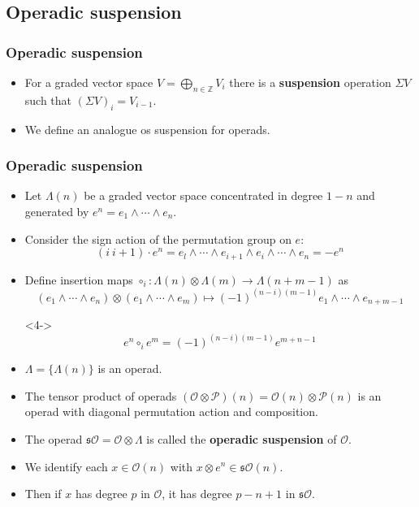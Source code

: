 \documentclass{beamer}
\theoremstyle{definition}
\newcommand{\Z}{\mathbb{Z}}
\begin{document}
\subsection{Operadic suspension}
\begin{frame}
\frametitle{Operadic suspension}
\begin{itemize}
\item<1-> For a graded vector space $V=\bigoplus_{n\in\Z} V_i$ there is a \textbf{suspension} operation $\Sigma V$ such that $(\Sigma V)_i=V_{i-1}$. %
\item<2-> We define an analogue os suspension for operads.
\end{itemize}
\end{frame}
\begin{frame}
\frametitle{Operadic suspension}
\begin{itemize}
\item<1-> Let $\Lambda(n)$ be a graded vector space concentrated in degree $1-n$ and generated by $e^n=e_1\land\cdots\land e_n$.
\item<2-> Consider the sign action of the permutation group on $e$:
\[(i\ i+1)\cdot e^n=e_l\land\cdots\land e_{i+1}\land e_i\land\cdots\land e_n=-e^n\]
\item<3-> Define insertion maps $\circ_i:\Lambda(n)\otimes\Lambda(m)\to\Lambda(n+m-1)$ as
\[(e_1\land\cdots\land e_n)\otimes(e_1\land\cdots\land e_m)\mapsto  (-1)^{(n-i)(m-1)}e_1\land\cdots\land e_{n+m-1}\]
\item[]<4-> \[e^n\circ_i e^m= (-1)^{(n-i)(m-1)}e^{m+n-1}\]
\end{itemize}
\end{frame}

\begin{frame}
\begin{itemize}
\item<1-> $\Lambda=\{\Lambda(n)\}$ is an operad.
\item<2-> The tensor product of operads $(\mathcal{O}\otimes \mathcal{P})(n)=\mathcal{O}(n)\otimes \mathcal{P}(n)$ is an operad with diagonal permutation action and composition. %
\item<3-> The operad $\mathfrak{s}\mathcal{O}=\mathcal{O}\otimes\Lambda$ is called the \textbf{operadic suspension} of $\mathcal{O}$.
\item<4-> We identify each $x\in\mathcal{O}(n)$ with $x\otimes e^n\in \mathfrak{s}\mathcal{O}(n)$.
\item<5-> Then if $x$ has degree $p$ in $\mathcal{O}$, it has degree $p-n+1$ in $\mathfrak{s}\mathcal{O}$.
\end{itemize}
\end{frame}
\end{document}
